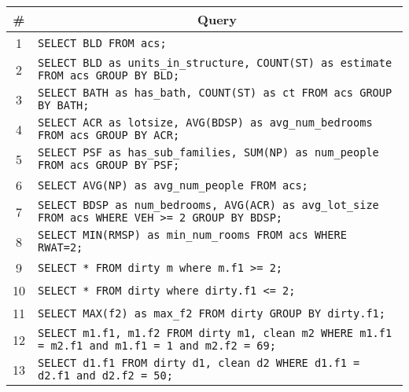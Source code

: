 \begin{tabular}{cl}
\toprule
\# & \multicolumn{1}{c}{Query} \\
\midrule
1 & \verb|SELECT BLD FROM acs;| {queryno} \label{q1} \\
2 & \verb|SELECT BLD as units_in_structure, COUNT(ST) as estimate FROM acs GROUP BY BLD;| {queryno} \label{q2} \\
3 & \verb|SELECT BATH as has_bath, COUNT(ST) as ct FROM acs GROUP BY BATH;| {queryno} \label{q3} \\
4 & \verb|SELECT ACR as lotsize, AVG(BDSP) as avg_num_bedrooms FROM acs GROUP BY ACR;| {queryno} \label{q4} \\
5 & \verb|SELECT PSF as has_sub_families, SUM(NP) as num_people FROM acs GROUP BY PSF;| {queryno} \label{q5} \\
6 & \verb|SELECT AVG(NP) as avg_num_people FROM acs;| {queryno} \label{q6} \\
7 & \verb|SELECT BDSP as num_bedrooms, AVG(ACR) as avg_lot_size FROM acs WHERE VEH >= 2 GROUP BY BDSP;| {queryno} \label{q7} \\
8 & \verb|SELECT MIN(RMSP) as min_num_rooms FROM acs WHERE RWAT=2;| {queryno} \label{q8} \\
9 & \verb|SELECT * FROM dirty m where m.f1 >= 2;| {queryno} \label{q9} \\
10 & \verb|SELECT * FROM dirty where dirty.f1 <= 2;| {queryno} \label{q10} \\
11 & \verb|SELECT MAX(f2) as max_f2 FROM dirty GROUP BY dirty.f1;| {queryno} \label{q11} \\
12 & \verb|SELECT m1.f1, m1.f2 FROM dirty m1, clean m2 WHERE m1.f1 = m2.f1 and m1.f1 = 1 and m2.f2 = 69;| {queryno} \label{q12} \\
13 & \verb|SELECT d1.f1 FROM dirty d1, clean d2 WHERE d1.f1 = d2.f1 and d2.f2 = 50;| {queryno} \label{q13} \\
\bottomrule
\end{tabular}
